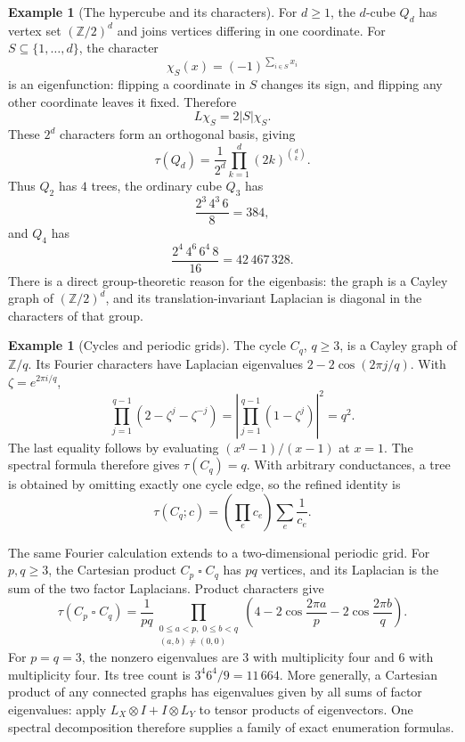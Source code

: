 \documentclass[11pt]{article}
\theoremstyle{definition}
\newtheorem{example}[theorem]{Example}
\theoremstyle{remark}
\newcommand{\Z}{\mathbb Z}
\begin{document}
\begin{example}[The hypercube and its characters]\label{ex:glin-cube}
For $d\ge1$, the $d$-cube $Q_d$ has vertex set $(\Z/2)^d$ and joins vertices differing in one coordinate. For $S\subseteq\{1,\ldots,d\}$, the character
\[
 \chi_S(x)=(-1)^{\sum_{i\in S}x_i}
\]
is an eigenfunction: flipping a coordinate in $S$ changes its sign, and flipping any other coordinate leaves it fixed. Therefore
\[
 L\chi_S=2|S|\chi_S.
\]
These $2^d$ characters form an orthogonal basis, giving
\[
 \tau(Q_d)=\frac1{2^d}\prod_{k=1}^d(2k)^{\binom dk}.
\]
Thus $Q_2$ has $4$ trees, the ordinary cube $Q_3$ has
\[
 \frac{2^3\,4^3\,6}{8}=384,
\]
and $Q_4$ has
\[
 \frac{2^4\,4^6\,6^4\,8}{16}=42\,467\,328.
\]
There is a direct group-theoretic reason for the eigenbasis: the graph is a Cayley graph of $(\Z/2)^d$, and its translation-invariant Laplacian is diagonal in the characters of that group.
\end{example}

\begin{example}[Cycles and periodic grids]\label{ex:glin-periodic}
The cycle $C_q$, $q\ge3$, is a Cayley graph of $\Z/q$. Its Fourier characters have Laplacian eigenvalues $2-2\cos(2\pi j/q)$. With $\zeta=e^{2\pi i/q}$,
\[
 \prod_{j=1}^{q-1}(2-\zeta^j-\zeta^{-j})
 =\left|\prod_{j=1}^{q-1}(1-\zeta^j)\right|^2=q^2.
\]
The last equality follows by evaluating $(x^q-1)/(x-1)$ at $x=1$. The spectral formula therefore gives $\tau(C_q)=q$. With arbitrary conductances, a tree is obtained by omitting exactly one cycle edge, so the refined identity is
\[
 \tau(C_q;c)=\left(\prod_e c_e\right)\sum_e\frac1{c_e}.
\]

The same Fourier calculation extends to a two-dimensional periodic grid. For $p,q\ge3$, the Cartesian product $C_p\mathbin\square C_q$ has $pq$ vertices, and its Laplacian is the sum of the two factor Laplacians. Product characters give
\[
 \tau(C_p\mathbin\square C_q)=\frac1{pq}
 \prod_{\substack{0\le a<p,\;0\le b<q\\(a,b)\ne(0,0)}}
 \left(4-2\cos\frac{2\pi a}{p}-2\cos\frac{2\pi b}{q}\right).
\]
For $p=q=3$, the nonzero eigenvalues are $3$ with multiplicity four and $6$ with multiplicity four. Its tree count is $3^4 6^4/9=11\,664$. More generally, a Cartesian product of any connected graphs has eigenvalues given by all sums of factor eigenvalues: apply $L_X\otimes I+I\otimes L_Y$ to tensor products of eigenvectors. One spectral decomposition therefore supplies a family of exact enumeration formulas.
\end{example}
\end{document}
